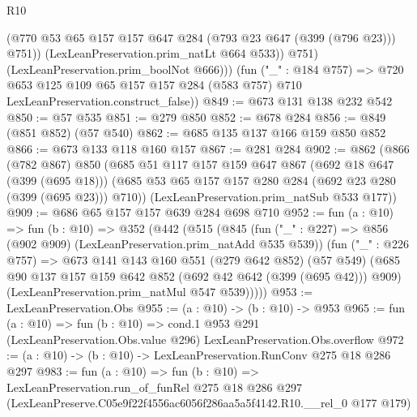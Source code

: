 \begin{lexlean}{R10}
\begin{coremodule}
                (@770 @53 @65 @157 @157 @647 @284 (@793 @23 @647 (@399 (@796 @23))) @751))
              (LexLeanPreservation.prim_natLt @664 @533))
            @751)
          (LexLeanPreservation.prim_boolNot @666)))
      (fun ("_" : @184 @757) =>
      @720 @653 @125 @109 @65 @157 @157 @284 (@583 @757) @710 LexLeanPreservation.construct_false))
@849 := @673 @131 @138 @232 @542
@850 := @57 @535
@851 := @279 @850
@852 := @678 @284
@856 := @849 (@851 @852) (@57 @540)
@862 := @685 @135 @137 @166 @159 @850 @852
@866 := @673 @133 @118 @160 @157
@867 := @281 @284
@902 := @862
    (@866
      (@782 @867)
      @850
      (@685
        @51
        @117
        @157
        @159
        @647
        @867
        (@692 @18 @647 (@399 (@695 @18)))
        (@685 @53 @65 @157 @157 @280 @284 (@692 @23 @280 (@399 (@695 @23))) @710))
      (LexLeanPreservation.prim_natSub @533 @177))
@909 := @686 @65 @157 @157 @639 @284 @698 @710
@952 := fun (a : @10) =>
  fun (b : @10) =>
  @352
    (@442
      (@515
        (@845
          (fun ("_" : @227) => @856 (@902 @909) (LexLeanPreservation.prim_natAdd @535 @539))
          (fun ("_" : @226 @757) =>
          @673
            @141
            @143
            @160
            @551
            (@279 @642 @852)
            (@57 @549)
            (@685 @90 @137 @157 @159 @642 @852 (@692 @42 @642 (@399 (@695 @42))) @909)
            (LexLeanPreservation.prim_natMul @547 @539)))))
@953 := LexLeanPreservation.Obs
@955 := (a : @10) -> (b : @10) -> @953
@965 := fun (a : @10) =>
  fun (b : @10) =>
  cond.{1} @953 @291 (LexLeanPreservation.Obs.value @296) LexLeanPreservation.Obs.overflow
@972 := (a : @10) -> (b : @10) -> LexLeanPreservation.RunConv @275 @18 @286 @297
@983 := fun (a : @10) =>
  fun (b : @10) =>
  LexLeanPreservation.run_of_funRel
    @275
    @18
    @286
    @297
    (LexLeanPreserve.C05e9f22f4556ac6056f286aa5a5f4142.R10.__rel_0 @177 @179)
\end{coremodule}
\end{lexlean}
